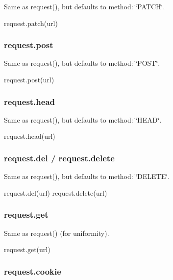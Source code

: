 Same as {\ttfamily request()}, but defaults to {\ttfamily method\+: \char`\"{}\+P\+A\+T\+C\+H\char`\"{}}.


\begin{DoxyCode}
request.patch(url)
\end{DoxyCode}


\subsubsection*{request.\+post}

Same as {\ttfamily request()}, but defaults to {\ttfamily method\+: \char`\"{}\+P\+O\+S\+T\char`\"{}}.


\begin{DoxyCode}
request.post(url)
\end{DoxyCode}


\subsubsection*{request.\+head}

Same as {\ttfamily request()}, but defaults to {\ttfamily method\+: \char`\"{}\+H\+E\+A\+D\char`\"{}}.


\begin{DoxyCode}
request.head(url)
\end{DoxyCode}


\subsubsection*{request.\+del / request.\+delete}

Same as {\ttfamily request()}, but defaults to {\ttfamily method\+: \char`\"{}\+D\+E\+L\+E\+T\+E\char`\"{}}.


\begin{DoxyCode}
request.del(url)
request.delete(url)
\end{DoxyCode}


\subsubsection*{request.\+get}

Same as {\ttfamily request()} (for uniformity).


\begin{DoxyCode}
request.get(url)
\end{DoxyCode}
 \subsubsection*{request.\+cookie}

